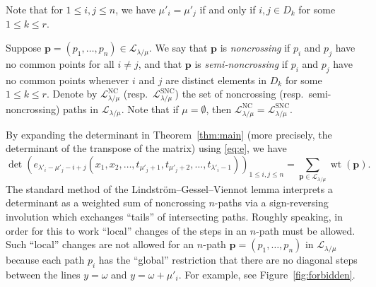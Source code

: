 \documentclass{amsart}
\numberwithin{equation}{section}
\theoremstyle{definition}
\newcommand\LL{\mathcal{L}_\lm}
\newcommand\lsnc{\LL^{\operatorname{SNC}}}
\newcommand\lnc{\LL^{\operatorname{NC}}}
\newcommand\pp{\mathbf{p}}
\newcommand\lm{{\lambda/\mu}}
\newcommand\wt{\operatorname{wt}}
\begin{document}
Note that for $1\le i,j\le n$, we have $\mu'_i=\mu'_{j}$ if and only if $i,j\in
D_k$ for some $1\le k\le r$.


Suppose $\pp= (p_1,\dots,p_n)\in \LL$. We say that $\pp$ is \emph{noncrossing}
if $p_i$ and $p_j$ have no common points for all $i\ne j$, and that $\pp$ is
\emph{semi-noncrossing} if $p_i$ and $p_j$ have no common points whenever $i$
and $j$ are distinct elements in $D_k$ for some $1\le k\le r$. Denote by $\lnc$
(resp.~$\lsnc$) the set of noncrossing (resp.~semi-noncrossing) paths in $\LL$.
Note that if $\mu=\emptyset$, then $\lnc=\lsnc$.

By expanding the determinant in Theorem~\ref{thm:main} (more precisely, the
determinant of the transpose of the matrix) using \eqref{eq:e}, we have
\begin{equation}
  \label{eq:1}
\det \left(
    e_{\lambda'_i-\mu'_j-i+j}(x_1,x_2,\dots,t_{\mu'_j+1},t_{\mu'_j+2},\dots,
    t_{\lambda'_i-1}) \right)_{1\le i,j\le n}  =\sum_{\pp\in \LL} \wt(\pp). 
\end{equation}
The standard method of the Lindstr\"om--Gessel--Viennot lemma
\cite{LGV,Lindstrom} interprets a determinant as a weighted sum of noncrossing
$n$-paths via a sign-reversing involution which exchanges ``tails'' of
intersecting paths. Roughly speaking, in order for this to work ``local''
changes of the steps in an $n$-path must be allowed. Such ``local'' changes are
not allowed for an $n$-path $\pp=(p_1,\dots,p_n)$ in $\LL$ because each path
$p_i$ has the ``global'' restriction that there are no diagonal steps between
the lines $y=\omega$ and $y=\omega+\mu'_i$. For example, see
Figure~\ref{fig:forbidden}. 
\end{document}
